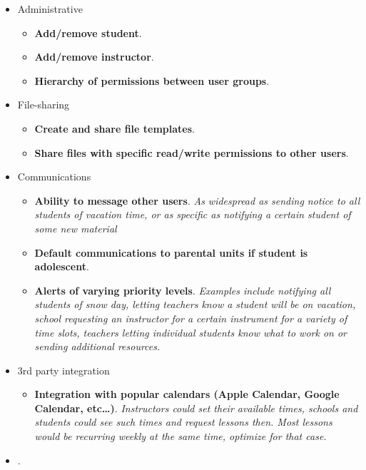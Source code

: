         \begin{itemize}
            \item Administrative
            \begin{itemize}
                \item \textbf{Add/remove student}. 
                \item \textbf{Add/remove instructor}. 
                \item \textbf{Hierarchy of permissions between user groups}.
            \end{itemize}
            \item File-sharing
            \begin{itemize}                
                \item \textbf{Create and share file templates}.
                \item \textbf{Share files with specific read/write permissions to other users}.
            \end{itemize}
            \item Communications
            \begin{itemize}
                \item \textbf{Ability to message other users}. \emph{As widespread as sending notice to all students of vacation time, or as specific as notifying a certain student of some new material}
                \item \textbf{Default communications to parental units if student is adolescent}.
                \item \textbf{Alerts of varying priority levels}. \emph{Examples include notifying all students of snow day, letting teachers know a student will be on vacation, school requesting an instructor for a certain instrument for a variety of time slots, teachers letting individual students know what to work on or sending additional resources.}
            \end{itemize}
            \item 3rd party integration
            \begin{itemize}                
                \item \textbf{Integration with popular calendars (Apple Calendar, Google Calendar, etc\dots)}. \emph{Instructors could set their available times, schools and students could see such times and request lessons then. Most lessons would be recurring weekly at the same time, optimize for that case.}
            \end{itemize}
            \item \textbf{}.
        \end{itemize}
